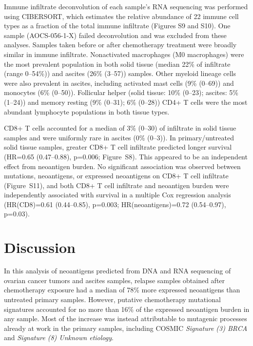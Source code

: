 \documentclass[linenumbers]{bmcart}
\begin{document}
Immune infiltrate deconvolution of each sample's RNA sequencing was performed using CIBERSORT, which estimates the relative abundance of 22 immune cell types as a fraction of the total immune infiltrate (Figures S9 and S10). One sample (AOCS-056-1-X) failed deconvolution and was excluded from these analyses. Samples taken before or after chemotherapy treatment were broadly similar in immune infiltrate. Nonactivated macrophages (M0 macrophages) were the most prevalent population in both solid tissue (median 22\% of infiltrate (range 0--54\%)) and ascites (26\% (3--57)) samples. Other myeloid lineage cells were also prevalent in ascites, including activated mast cells (9\% (0--69)) and monocytes (6\% (0--50)). Follicular helper (solid tissue: 10\% (0--23); ascites: 5\% (1--24)) and memory resting (9\% (0--31); 6\% (0--28)) CD4+ T cells were the most abundant lymphocyte populations in both tissue types.


CD8+ T cells accounted for a median of 3\% (0--30) of infiltrate in solid tissue samples and were uniformly rare in ascites (0\% (0--3)). In primary/untreated solid tissue samples, greater CD8+ T cell infiltrate predicted longer survival (HR=0.65 (0.47--0.88), p=0.006; Figure~S8). This appeared to be an independent effect from neoantigen burden. No significant association was observed between mutations, neoantigens, or expressed neoantigens on CD8+ T cell infiltrate (Figure~S11), and both CD8+ T cell infiltrate and neoantigen burden were independently associated with survival in a multiple Cox regression analysis (HR(CD8)=0.61 (0.44--0.85), p=0.003; HR(neoantigens)=0.72 (0.54--0.97), p=0.03). 

\section*{Discussion}
In this analysis of neoantigens predicted from DNA and RNA sequencing of ovarian cancer tumors and ascites samples, relapse samples obtained after chemotherapy exposure had a median of 78\% more expressed neoantigens than untreated primary samples. However, putative chemotherapy mutational signatures accounted for no more than 16\% of the expressed neoantigen burden in any sample. Most of the increase was instead attributable to mutagenic processes already at work in the primary samples, including COSMIC \textit{Signature (3) BRCA} and \textit{Signature (8) Unknown etiology}.
\end{document}
